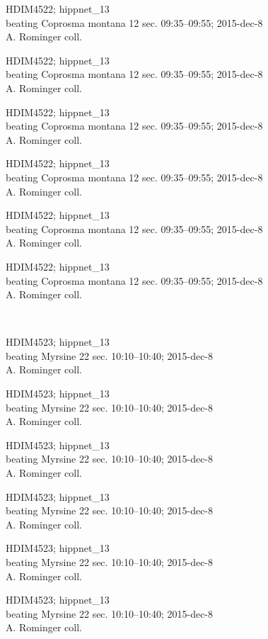 \documentclass[2pt]{extarticle}
\begin{document}
\noindent
\parbox{0.16\textwidth}{\tiny \raggedright \rule[-0.3\baselineskip]{0pt}{10pt}HDIM4522; hippnet\_13\\ beating Coprosma montana 12 sec. 09:35--09:55; 2015-dec-8\\ A. Rominger coll.}
\parbox{0.16\textwidth}{\tiny \raggedright \rule[-0.3\baselineskip]{0pt}{10pt}HDIM4522; hippnet\_13\\ beating Coprosma montana 12 sec. 09:35--09:55; 2015-dec-8\\ A. Rominger coll.}
\parbox{0.16\textwidth}{\tiny \raggedright \rule[-0.3\baselineskip]{0pt}{10pt}HDIM4522; hippnet\_13\\ beating Coprosma montana 12 sec. 09:35--09:55; 2015-dec-8\\ A. Rominger coll.}
\parbox{0.16\textwidth}{\tiny \raggedright \rule[-0.3\baselineskip]{0pt}{10pt}HDIM4522; hippnet\_13\\ beating Coprosma montana 12 sec. 09:35--09:55; 2015-dec-8\\ A. Rominger coll.}
\parbox{0.16\textwidth}{\tiny \raggedright \rule[-0.3\baselineskip]{0pt}{10pt}HDIM4522; hippnet\_13\\ beating Coprosma montana 12 sec. 09:35--09:55; 2015-dec-8\\ A. Rominger coll.}
\parbox{0.16\textwidth}{\tiny \raggedright \rule[-0.3\baselineskip]{0pt}{10pt}HDIM4522; hippnet\_13\\ beating Coprosma montana 12 sec. 09:35--09:55; 2015-dec-8\\ A. Rominger coll.} \\ 
\vspace{0.001in} 

\noindent
\parbox{0.16\textwidth}{\tiny \raggedright \rule[-0.3\baselineskip]{0pt}{10pt}HDIM4523; hippnet\_13\\ beating Myrsine 22 sec. 10:10--10:40; 2015-dec-8\\ A. Rominger coll.}
\parbox{0.16\textwidth}{\tiny \raggedright \rule[-0.3\baselineskip]{0pt}{10pt}HDIM4523; hippnet\_13\\ beating Myrsine 22 sec. 10:10--10:40; 2015-dec-8\\ A. Rominger coll.}
\parbox{0.16\textwidth}{\tiny \raggedright \rule[-0.3\baselineskip]{0pt}{10pt}HDIM4523; hippnet\_13\\ beating Myrsine 22 sec. 10:10--10:40; 2015-dec-8\\ A. Rominger coll.}
\parbox{0.16\textwidth}{\tiny \raggedright \rule[-0.3\baselineskip]{0pt}{10pt}HDIM4523; hippnet\_13\\ beating Myrsine 22 sec. 10:10--10:40; 2015-dec-8\\ A. Rominger coll.}
\parbox{0.16\textwidth}{\tiny \raggedright \rule[-0.3\baselineskip]{0pt}{10pt}HDIM4523; hippnet\_13\\ beating Myrsine 22 sec. 10:10--10:40; 2015-dec-8\\ A. Rominger coll.}
\parbox{0.16\textwidth}{\tiny \raggedright \rule[-0.3\baselineskip]{0pt}{10pt}HDIM4523; hippnet\_13\\ beating Myrsine 22 sec. 10:10--10:40; 2015-dec-8\\ A. Rominger coll.} \\ 
\vspace{0.001in} 
\end{document}
